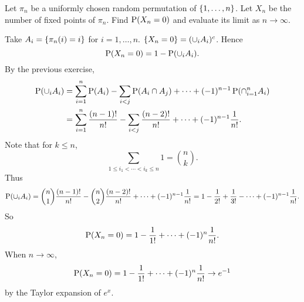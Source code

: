 \documentclass[a4paper, 12pt]{article}
\begin{document}
\begin{exercise}{2.3}
    Let $\pi_n$ be a uniformly chosen random permutation of $\set{1,\ldots,n}$. 
    Let $X_n$ be the number of fixed points of $\pi_n$. Find $\P(X_n = 0)$ 
    and evaluate its limit as $n\to\infty$. 
\end{exercise}
\begin{solution}
    Take $A_i = \set{\pi_n(i) = i}$ for $i=1,\ldots,n$. $\set{X_n = 0} = (\cup_i A_i)^c$. 
    Hence 
    \begin{equation*}
        \P(X_n = 0) = 1 - \P(\cup_i A_i).
    \end{equation*} 
    By the previous exercise, 
    \begin{equation*}
        \begin{split}
            \P(\cup_i A_i) &= \sum_{i=1}^n \P(A_i) - \sum_{i<j}\P(A_i\cap A_j) 
            + \cdots + (-1)^{n-1}\P(\cap_{i=1}^n A_i) \\
            &= \sum_{i=1}^n \frac{(n-1)!}{n!} - \sum_{i<j}\frac{(n-2)!}{n!} + \cdots 
            + (-1)^{n-1}\frac{1}{n!}.
        \end{split}
    \end{equation*}
    Note that for $k\leq n$, 
    \begin{equation*}
        \sum_{1\leq i_1<\cdots<i_k\leq n}1 
        = \binom{n}{k}. 
    \end{equation*}
    Thus 
    \begin{equation*}
        \P(\cup_i A_i) = \binom{n}{1}\frac{(n-1)!}{n!} - \binom{n}{2}\frac{(n-2)!}{n!} + \cdots + (-1)^{n-1}\frac{1}{n!} 
        = 1 - \frac{1}{2!} + \frac{1}{3!} - \cdots + (-1)^{n-1}\frac{1}{n!}. 
    \end{equation*}
    So 
    \begin{equation*}
        \P(X_n = 0) = 1 - \frac{1}{1!} + \cdots + (-1)^n\frac{1}{n!}. 
    \end{equation*}
    When $n\to\infty$, 
    \begin{equation*}
        \P(X_n = 0) = 1 - \frac{1}{1!} + \cdots + (-1)^n\frac{1}{n!} 
        \to e^{-1}
    \end{equation*}
    by the Taylor expansion of $e^x$. 
\end{solution}
\end{document}
